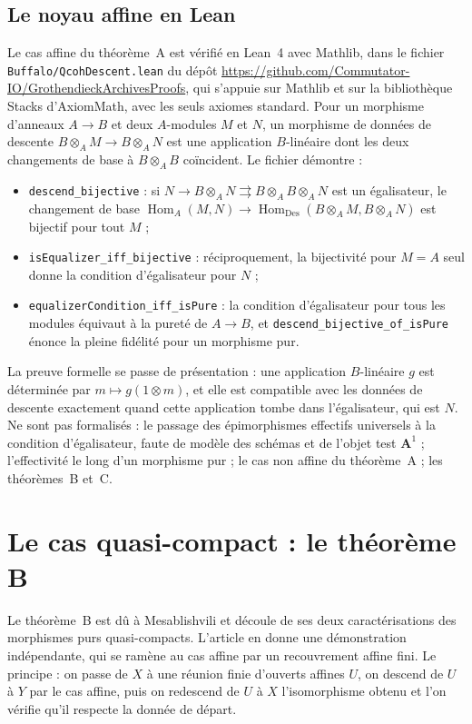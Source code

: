 \documentclass[11pt,a4paper]{amsart}
\theoremstyle{definition}
\theoremstyle{plain}
\theoremstyle{remark}
\newcommand{\Des}{\mathrm{Des}}
\newcommand{\Hom}{\operatorname{Hom}}
\begin{document}
\subsection{Le noyau affine en Lean}

Le cas affine du théorème~A est vérifié en Lean~4 avec Mathlib, dans le fichier \texttt{Buffalo/\allowbreak QcohDescent.lean} du dépôt \url{https://github.com/Commutator-IO/GrothendieckArchivesProofs}, qui s'appuie sur Mathlib et sur la bibliothèque Stacks d'AxiomMath, avec les seuls axiomes standard. Pour un morphisme d'anneaux $A\to B$ et deux $A$-modules $M$ et $N$, un morphisme de données de descente $B\otimes_AM\to B\otimes_AN$ est une application $B$-linéaire dont les deux changements de base à $B\otimes_AB$ coïncident. Le fichier démontre :
\begin{itemize}
\item \texttt{descend\_bijective} : si $N\to B\otimes_AN\rightrightarrows B\otimes_AB\otimes_AN$ est un égalisateur, le changement de base $\Hom_A(M,N)\to\Hom_{\Des}(B\otimes_AM,B\otimes_AN)$ est bijectif pour tout $M$ ;
\item \texttt{isEqualizer\_iff\_bijective} : réciproquement, la bijectivité pour $M=A$ seul donne la condition d'égalisateur pour $N$ ;
\item \texttt{equalizerCondition\_iff\_isPure} : la condition d'égalisateur pour tous les modules équivaut à la pureté de $A\to B$, et \texttt{descend\_bijective\_of\_isPure} énonce la pleine fidélité pour un morphisme pur.
\end{itemize}
La preuve formelle se passe de présentation : une application $B$-linéaire $g$ est déterminée par $m\mapsto g(1\otimes m)$, et elle est compatible avec les données de descente exactement quand cette application tombe dans l'égalisateur, qui est $N$. Ne sont pas formalisés : le passage des épimorphismes effectifs universels à la condition d'égalisateur, faute de modèle des schémas et de l'objet test $\mathbf A^1$ ; l'effectivité le long d'un morphisme pur ; le cas non affine du théorème~A ; les théorèmes~B et~C.

\section{Le cas quasi-compact : le théorème B}

Le théorème~B est dû à Mesablishvili et découle de ses deux caractérisations des morphismes purs quasi-compacts. L'article en donne une démonstration indépendante, qui se ramène au cas affine par un recouvrement affine fini. Le principe : on passe de $X$ à une réunion finie d'ouverts affines $U$, on descend de $U$ à $Y$ par le cas affine, puis on redescend de $U$ à $X$ l'isomorphisme obtenu et l'on vérifie qu'il respecte la donnée de départ.
\end{document}
